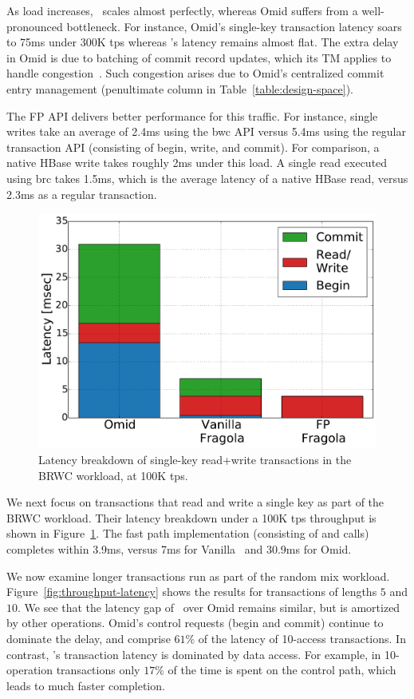 As load increases, \sys\ scales almost perfectly, whereas Omid suffers from a well-pronounced 
bottleneck. For instance, Omid's single-key transaction latency soars to 75ms under 300K tps whereas
{\sys}'s latency remains almost flat. The extra delay in Omid is due to batching of commit record updates, 
which its TM applies to handle congestion~\cite{Omid2017}. Such congestion arises due to Omid's centralized 
commit entry management (penultimate column in Table~\ref{table:design-space}).

The FP API delivers better performance for this traffic. For instance, single writes take an average of 2.4ms using 
the {\code bwc} API versus 5.4ms using the regular transaction API (consisting of begin, write, and commit). 
For comparison, a native HBase write takes roughly 2ms under this load.
A single read executed using {\code brc} takes 1.5ms, which is the average latency of a native HBase read,
versus 2.3ms as a regular transaction. 

\begin{figure}[htb]
\centering
\includegraphics[width=.45\textwidth]{figs/latency_rwm.pdf}
\caption{Latency breakdown of single-key read+write transactions in the BRWC workload,
at 100K tps.}
\label{fig:rmw}
\end{figure}

We next focus on transactions that read and write a single key as part of the BRWC workload. 
Their latency breakdown under a 100K tps throughput is shown in Figure~\ref{fig:rmw}.
The fast path implementation (consisting of  and  calls) completes within 3.9ms,
versus 7ms for Vanilla \sys\ and 30.9ms for Omid. 

We now examine longer transactions run as part of the random mix workload.
Figure~\ref{fig:throughput-latency} shows the results for transactions of lengths $5$ and $10$.
We see that the latency gap of \sys\ over Omid remains similar, but is amortized 
by other operations. Omid's control requests (begin and commit) continue to 
dominate the delay, and comprise $61\%$ of the latency of 10-access transactions.
In contrast, \sys's transaction latency is dominated by data access. For example, in 10-operation transactions only 
$17\%$ of the time is spent on the control path, which leads to much faster completion. 

